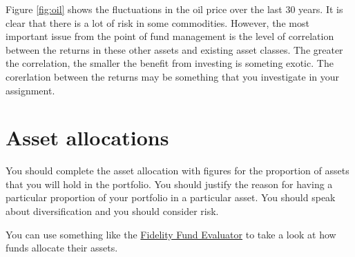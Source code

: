 \documentclass[12pt, a4paper, oneside]{article}\usepackage{graphicx, color}
\begin{document}
Figure \ref{fig:oil} shows the fluctuations in the oil price over the last 30 years.  It is clear that there is a lot of risk in some commodities.  However, the most important issue from the point of fund management is the level of correlation between the returns in these other assets and existing asset classes.  The greater the correlation, the smaller the benefit from investing is someting exotic.  The corerlation between the returns may be something that you investigate in your assignment.   

\section{Asset allocations}
You should complete the asset allocation with figures for the proportion of assets that you will hold in the portfolio.  You should justify the reason for having a particular proportion of your portfolio in a particular asset.  You should speak about diversification and you should consider risk. 


You can use something like the \href{https://www.fidelity.co.uk/investor/funds/find-funds/fund-evaluator/fund-evaluator.page}{Fidelity Fund Evaluator} to take a look at how funds allocate their assets.  
\end{document}
